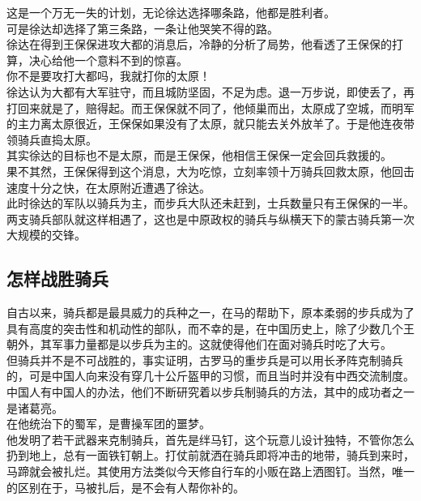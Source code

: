 \begin{multicols}{\theparacolNo}
这是一个万无一失的计划，无论徐达选择哪条路，他都是胜利者。\\

可是徐达却选择了第三条路，一条让他哭笑不得的路。\\

徐达在得到王保保进攻大都的消息后，冷静的分析了局势，他看透了王保保的打算，决心给他一个意料不到的惊喜。\\

你不是要攻打大都吗，我就打你的太原！\\

徐达认为大都有大军驻守，而且城防坚固，不足为虑。退一万步说，即使丢了，再打回来就是了，赔得起。而王保保就不同了，他倾巢而出，太原成了空城，而明军的主力离太原很近，王保保如果没有了太原，就只能去关外放羊了。于是他连夜带领骑兵直捣太原。\\

其实徐达的目标也不是太原，而是王保保，他相信王保保一定会回兵救援的。\\

果不其然，王保保得到这个消息，大为吃惊，立刻率领十万骑兵回救太原，他回击速度十分之快，在太原附近遭遇了徐达。\\

此时徐达的军队以骑兵为主，而步兵大队还未赶到，士兵数量只有王保保的一半。\\

两支骑兵部队就这样相遇了，这也是中原政权的骑兵与纵横天下的蒙古骑兵第一次大规模的交锋。\\

\subsection{怎样战胜骑兵}
自古以来，骑兵都是最具威力的兵种之一，在马的帮助下，原本柔弱的步兵成为了具有高度的突击性和机动性的部队，而不幸的是，在中国历史上，除了少数几个王朝外，其军事力量都是以步兵为主的。这就使得他们在面对骑兵时吃了大亏。\\

但骑兵并不是不可战胜的，事实证明，古罗马的重步兵是可以用长矛阵克制骑兵的，可是中国人向来没有穿几十公斤盔甲的习惯，而且当时并没有中西交流制度。中国人有中国人的办法，他们不断研究着以步兵制骑兵的方法，其中的成功者之一是诸葛亮。\\

在他统治下的蜀军，是曹操军团的噩梦。\\

他发明了若干武器来克制骑兵，首先是绊马钉，这个玩意儿设计独特，不管你怎么扔到地上，总有一面铁钉朝上。打仗前就洒在骑兵即将冲击的地带，骑兵到来时，马蹄就会被扎烂。其使用方法类似今天修自行车的小贩在路上洒图钉。当然，唯一的区别在于，马被扎后，是不会有人帮你补的。\\


\end{multicols}
